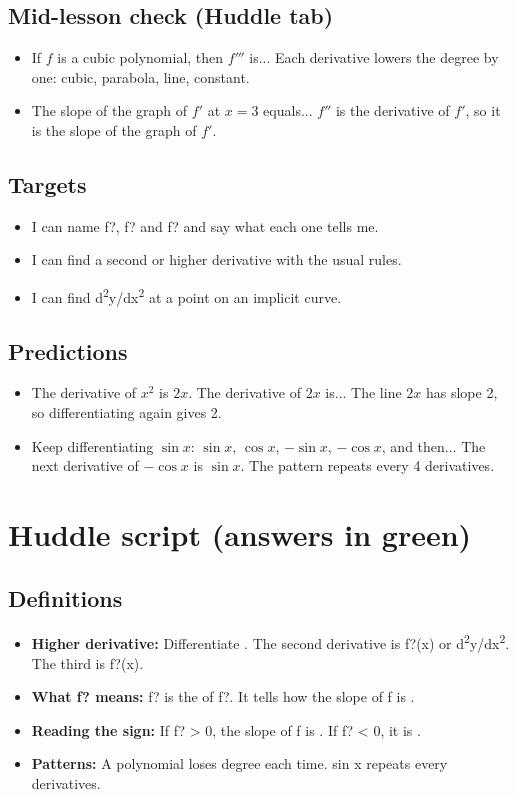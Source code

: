 \documentclass[11pt]{article}
\begin{document}
\subsection*{Mid-lesson check (Huddle tab)}\begin{itemize}
\item If $f$ is a cubic polynomial, then $f'''$ is...  Each derivative lowers the degree by one: cubic, parabola, line, constant.
\item The slope of the graph of $f'$ at $x=3$ equals...  $f''$ is the derivative of $f'$, so it is the slope of the graph of $f'$.
\end{itemize}
\subsection*{Targets}\begin{itemize}\item I can name f?, f? and f? and say what each one tells me.
\item I can find a second or higher derivative with the usual rules.
\item I can find d\textsuperscript{2}y/dx\textsuperscript{2} at a point on an implicit curve.\end{itemize}
\subsection*{Predictions}\begin{itemize}
\item The derivative of $x^2$ is $2x$. The derivative of $2x$ is...  The line $2x$ has slope 2, so differentiating again gives 2.
\item Keep differentiating $\sin x$: $\sin x$, $\cos x$, $-\sin x$, $-\cos x$, and then...  The next derivative of $-\cos x$ is $\sin x$. The pattern repeats every 4 derivatives.
\end{itemize}
\section*{Huddle script (answers in green)}
\subsection*{Definitions}\begin{itemize}
\item \textbf{Higher derivative:} Differentiate . The second derivative is f?(x) or d\textsuperscript{2}y/dx\textsuperscript{2}. The third is f?(x).
\item \textbf{What f? means:} f? is the  of f?. It tells how the slope of f is .
\item \textbf{Reading the sign:} If f? > 0, the slope of f is . If f? < 0, it is .
\item \textbf{Patterns:} A polynomial loses  degree each time. sin x repeats every  derivatives.
\end{itemize}
\end{document}
